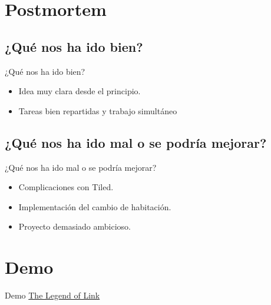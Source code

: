 \documentclass{beamer}
\begin{document}
\section{Postmortem}

\subsection{¿Qué nos ha ido bien?}

\begin{frame}{¿Qué nos ha ido bien?}
	\begin{itemize}
		\item Idea muy clara desde el principio.
		\item Tareas bien repartidas y trabajo simultáneo
	\end{itemize}
\end{frame}

\subsection{¿Qué nos ha ido mal o se podría mejorar?}

\begin{frame}{¿Qué nos ha ido mal o se podría mejorar?}
	\begin{itemize}
		\item Complicaciones con Tiled.
		\item Implementación del cambio de habitación.
		\item Proyecto demasiado ambicioso.
	\end{itemize}
\end{frame}

\section{Demo}

\begin{frame}{Demo}
	\href{https://athoka.github.io/Link/}{{\color{blue}The Legend of Link}}
\end{frame}
\end{document}
